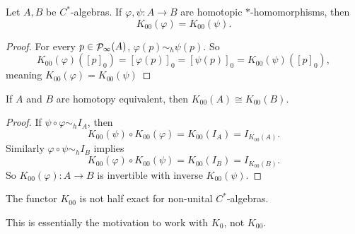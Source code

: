\begin{proposition} \label{prop:homotopyInvarianceK00}
Let $A,B$ be $C^*$-algebras. If $\varphi,\psi:A\to B$ are homotopic $*$-homomorphisms, then 
\[ K_{00}(\varphi) = K_{00}(\psi). \]
\end{proposition}
\begin{proof}
For every $p\in\mathop{\mathcal{P}}\nolimits_\infty(A)$, $\varphi(p)\sim_h \psi(p)$. So
\[ K_{00}(\varphi)([p]_0) = [\varphi(p)]_0 = [\psi(p)]_0 = K_{00}(\psi)([p]_0), \]
meaning $K_{00}(\varphi) = K_{00}(\psi)$
\end{proof}
\begin{corollary}
If $A$ and $B$ are homotopy equivalent, then $K_{00}(A)\cong K_{00}(B)$.
\end{corollary}
\begin{proof}
If $\psi\circ\varphi \sim_h I_A$, then
\[ K_{00}(\psi)\circ K_{00}(\varphi) = K_{00}(I_A) = I_{K_{00}(A)}. \]
Similarly $\varphi\circ\psi \sim_h I_B$ implies
\[ K_{00}(\varphi)\circ K_{00}(\psi) = K_{00}(I_B) = I_{K_{00}(B)}. \]
So $K_{00}(\varphi): A\to B$ is invertible with inverse $K_{00}(\psi)$.
\end{proof}

\begin{proposition}
The functor $K_{00}$ is not half exact for non-unital $C^*$-algebras.
\end{proposition}
This is essentially the motivation to work with $K_0$, not $K_{00}$.

